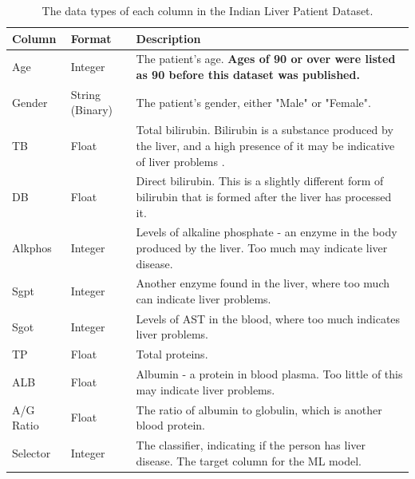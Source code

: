 \documentclass[12pt]{report}
\begin{document}
\begin{table}[H]
    \centering
        \begin{tabular}{ |p{}|p{}| p{}|}
            \hline
            \cellcolor{blue!25}Column & \cellcolor{blue!25}Format & \cellcolor{blue!25}Description\\
            \hline
            Age & Integer & The patient's age. \textbf{Ages of 90 or over were listed as 90 before this dataset was published.} \\
            \hline
            Gender & String (Binary) & The patient's gender, either "Male" or "Female".\\
            \hline
            TB & Float & Total bilirubin. Bilirubin is a substance produced by the liver, and a high presence of it may be indicative of
            liver problems \autocite{mayo_clinic_bilirubin_nodate}.\\
            \hline
            DB & Float & Direct bilirubin. This is a slightly different form of bilirubin that is formed after the liver has processed it.\\
            \hline
            Alkphos & Integer & Levels of alkaline phosphate - an enzyme in the body produced by the liver. Too much may indicate liver disease. \autocite{clevelandclinic_alkaline_nodate}\\
            \hline
            Sgpt & Integer & Another enzyme found in the liver, where too much can indicate liver problems.\\
            \hline
            Sgot & Integer & Levels of AST in the blood, where too much indicates liver problems.\\
            \hline
            TP & Float & Total proteins.\\
            \hline
            ALB & Float & Albumin - a protein in blood plasma. Too little of this may indicate liver problems.\\
            \hline
            A/G Ratio & Float & The ratio of albumin to globulin, which is another blood protein.\\
            \hline
            Selector & Integer & The classifier, indicating if the person has liver disease. The target column for the ML model.\\
            \hline
    \end{tabular}
    \caption{The data types of each column in the Indian Liver Patient Dataset.}\label{tab:ILPD-Types}
\end{table}
\end{document}
